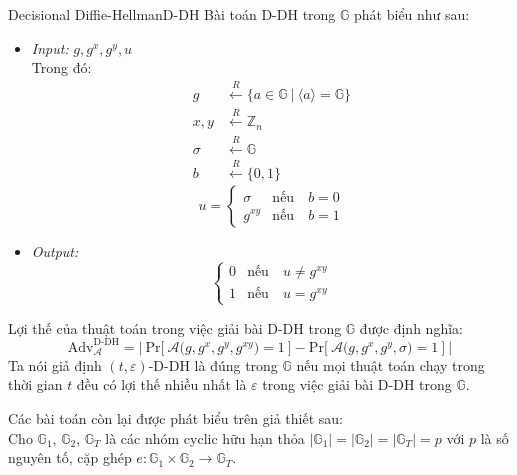 \documentclass[class=report, crop=false]{standalone}
\begin{document}
		\begin{problem}{Decisional Diffie-Hellman}{D-DH}
			Bài toán D-DH trong $\mathbb{G}$ phát biểu như sau:
			\vspace{-\baselineskip}
			\begin{itemize}[leftmargin=1.5cm, itemindent=-0.5cm]
				\item[] \textit{Input:} $g, g^x, g^y, u$ \\
				Trong đó: \vspace{-\baselineskip}
				\begin{align*}
					g 		&\xleftarrow{R} \{ a \in \mathbb{G}\ | \ \langle a \rangle = \mathbb{G} \} 	\\
					x, y 	&\xleftarrow{R} \mathbb{Z}_n 												\\
					\sigma 	&\xleftarrow{R} \mathbb{G}													\\
					b 		&\xleftarrow{R} \{ 0, 1 \}
				\end{align*}
				\[
					u = \begin{cases}
						\sigma 	&\text{nếu}\quad b = 0 \\
						g^{xy} 	&\text{nếu}\quad b = 1
					\end{cases}
				\]
				\item[] \textit{Output:}
				\[
					\begin{cases}
						0 &\text{nếu}\quad u \neq g^{xy} \\
						1 &\text{nếu}\quad u = g^{xy}
					\end{cases}
				\]
			\end{itemize}
			\vspace{-\baselineskip}\par
			Lợi thế của thuật toán \algo trong việc giải bài D-DH trong $\mathbb{G}$ được định nghĩa:
			\[
				\text{Adv}_{\mathcal{A}}^{\text{D-DH}} = \Bigg|\ \text{Pr}\bigg[ \ \mathcal{A}\Big(g, g^x, g^y, g^{xy} \Big) = 1 \ \bigg] - \text{Pr}\bigg[ \ \mathcal{A}\Big(g, g^x, g^y, \sigma \Big) = 1 \ \bigg]\ \Bigg|
			\] \indent
			Ta nói giả định $(t, \varepsilon)$-D-DH là đúng trong $\mathbb{G}$ nếu mọi thuật toán chạy trong thời gian $t$ đều có lợi thế nhiều nhất là $\varepsilon$ trong việc giải bài D-DH trong $\mathbb{G}$.
		\end{problem}
		Các bài toán còn lại được phát biểu trên giả thiết sau: \\ \indent
		Cho $\mathbb{G}_1$, $\mathbb{G}_2$, $\mathbb{G}_T$ là các nhóm cyclic hữu hạn thỏa $|\mathbb{G}_1| = |\mathbb{G}_2| = |\mathbb{G}_T| = p$ với $p$ là số nguyên tố, cặp ghép $e: \mathbb{G}_1 \times \mathbb{G}_2 \rightarrow \mathbb{G}_T$.
\end{document}
